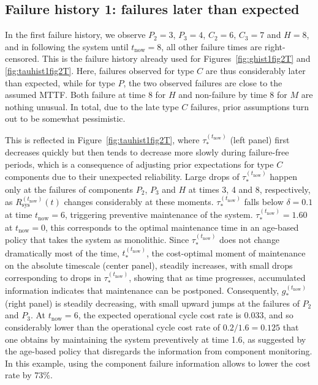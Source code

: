 \documentclass[authoryear]{elsarticle}
\def\tnow{t_\text{now}}
\newcommand{\Rsysnow}{R^{(t_\text{now})}_\text{sys}}
\newcommand{\tausnow}{\tau_*^{(\tnow)}}
\newcommand{\tstarnow}{t_*^{(\tnow)}}
\newcommand{\gstarnow}{g_*^{(\tnow)}}
\begin{document}
\subsection{Failure history 1: failures later than expected}
\label{sec:ex-1}

In the first failure history, we observe
$P_2 = 3$, $P_3 = 4$, $C_2 = 6$, $C_3 = 7$ and $H = 8$,
and in following the system until $\tnow = 8$,
all other failure times are right-censored.
This is the failure history already used for Figures~\ref{fig:ghist1fig2T} and \ref{fig:tauhist1fig2T}.
Here, failures observed for type $C$ are thus considerably later than expected,
while for type $P$, the two observed failures are close to the assumed MTTF. 
Both failure at time $8$ for $H$ and non-failure by time $8$ for $M$ are nothing unusual.
In total, due to the late type $C$ failures, prior assumptions turn out to be somewhat pessimistic.

This is reflected in Figure~\ref{fig:tauhist1fig2T},
where $\tausnow$ (left panel) first decreases quickly but then tends to decrease more slowly during failure-free periods,
which is a consequence of adjusting prior expectations for type $C$ components
due to their unexpected reliability.
Large drops of $\tausnow$ happen only at the failures of components $P_2$, $P_3$ and $H$
at times 3, 4 and 8, respectively,
as $\Rsysnow(t)$ changes considerably at these moments.
$\tausnow$ falls below $\delta = 0.1$ at time $\tnow = 6$,
triggering preventive maintenance of the system.
$\tausnow = 1.60$ at $\tnow = 0$, this corresponds to the optimal maintenance time
in an age-based policy that takes the system as monolithic. 
Since $\tausnow$ does not change dramatically most of the time, $\tstarnow$,
the cost-optimal moment of maintenance on the absolute timescale (center panel),
steadily increases, with small drops corresponding to drops in $\tausnow$,
showing that as time progresses, accumulated information indicates that maintenance can be postponed.
Consequently, $\gstarnow$ (right panel) is steadily decreasing,
with small upward jumps at the failures of $P_2$ and $P_3$.
At $\tnow = 6$, the expected operational cycle cost rate is $0.033$,
and so considerably lower than the operational cycle cost rate of $0.2 / 1.6 = 0.125$
that one obtains by maintaining the system preventively at time 1.6,
as suggested by the age-based policy that disregards the information from component monitoring.
In this example, using the component failure information allows to lower the cost rate by 73\%.
\end{document}
